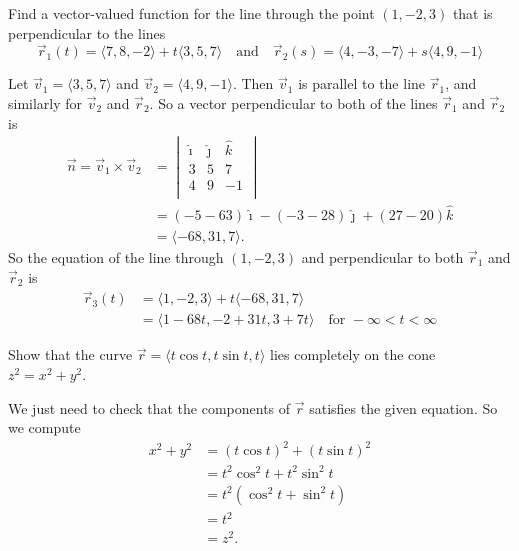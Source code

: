 \documentclass[handout]{ximera}
\begin{document}
\begin{problem}
Find a vector-valued function for the line through the point $(1,-2,3)$ that is perpendicular to the lines
	\[
	\vec{r}_1(t) = \langle 7,8,-2 \rangle + t \langle 3,5,7 \rangle 
	\quad \text{and} \quad 
	\vec{r}_2(s) = \langle 4,-3,-7 \rangle + s \langle 4,9,-1 \rangle
	\]
	\begin{freeResponse}
	Let $\vec{v}_1 = \langle 3,5,7 \rangle$ and $\vec{v}_2 = \langle 4,9,-1 \rangle$.
	Then $\vec{v}_1$ is parallel to the line $\vec{r}_1$, and similarly for $\vec{v}_2$ and $\vec{r}_2$.  
	So a vector perpendicular to both of the lines $\vec{r}_1$ and $\vec{r}_2$ is
		\begin{align*}
		\vec{n} = \vec{v}_1 \times \vec{v}_2  
		&= \begin{vmatrix}
		\hat{\imath}	&	\hat{\jmath}	&	\hat{k}	\\
		3		&	5		&	7		\\
		4		&	9		&	-1		\\
		\end{vmatrix}  \\
		&= (-5-63)\hat{\imath} - (-3-28)\hat{\jmath} + (27-20)\hat{k}  \\
		&= \langle -68, 31, 7 \rangle.
		\end{align*}
	So the equation of the line through $(1,-2,3)$ and perpendicular to both $\vec{r}_1$ and $\vec{r}_2$ is
		\begin{align*}
		\vec{r}_3(t) &= \langle 1,-2,3 \rangle + t \langle -68,31,7 \rangle  \\
		&= \boxed{\langle 1-68t,-2+31t,3+7t \rangle \quad \text{for }-\infty < t < \infty}
		\end{align*}
	\end{freeResponse}
	
\end{problem}

\begin{instructorNotes}

\end{instructorNotes}















\begin{problem}
Show that the curve $\vec{r} = \langle t \cos t, t \sin t, t \rangle$ lies completely on the cone $z^2 = x^2 + y^2$.  
	\begin{freeResponse}
	We just need to check that the components of $\vec{r}$ satisfies the given equation.  
	So we compute
		\begin{align*}
		x^2 + y^2 &= (t \cos t)^2 + (t \sin t)^2  \\
		&= t^2 \cos^2 t + t^2 \sin^2 t  \\
		&= t^2 (\cos^2 t + \sin^2 t)  \\
		&= t^2  \\
		&= z^2.
		\end{align*}
	\end{freeResponse}

\end{problem}
\end{document}

